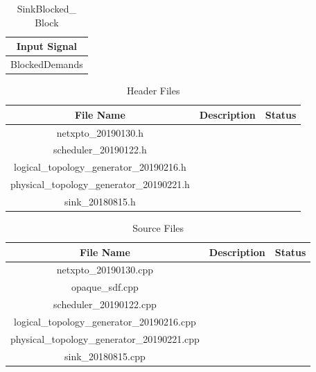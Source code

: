 \begin{table}[H]
	\centering
	\begin{tabular}{| c |}
		\hline
		\textbf{Input Signal}\\ \hline
		BlockedDemands       \\ \hline
	\end{tabular}
	\caption{SinkBlocked\_ Block}
	\label{sink_blocked_block_opaque}
\end{table}

\begin{table}[H]
	\centering
	\begin{tabular}{| c | c | c |}
		\hline
		\textbf{File Name}                        & \textbf{Description} & Status\\ \hline
		netxpto\_20190130.h                       &                      &       \\ \hline
		scheduler\_20190122.h                     &                      &       \\ \hline
		logical\_topology\_generator\_20190216.h  &                      &       \\ \hline
		physical\_topology\_generator\_20190221.h &                      &       \\ \hline
		sink\_20180815.h                          &                      &       \\ \hline
	\end{tabular}
	\caption{Header Files}
	\label{header_files_opaque}
\end{table}

\begin{table}[H]
	\centering
	\begin{tabular}{| c | c | c |}
		\hline
		\textbf{File Name}                          & \textbf{Description} & Status\\ \hline
		netxpto\_20190130.cpp                       &                      &       \\ \hline
		opaque\_sdf.cpp                             &                      &       \\ \hline
		scheduler\_20190122.cpp                     &                      &       \\ \hline
		logical\_topology\_generator\_20190216.cpp  &                      &       \\ \hline
		physical\_topology\_generator\_20190221.cpp &                      &       \\ \hline
		sink\_20180815.cpp                          &                      &       \\ \hline
	\end{tabular}
	\caption{Source Files}
	\label{source_files_opaque}
\end{table}
